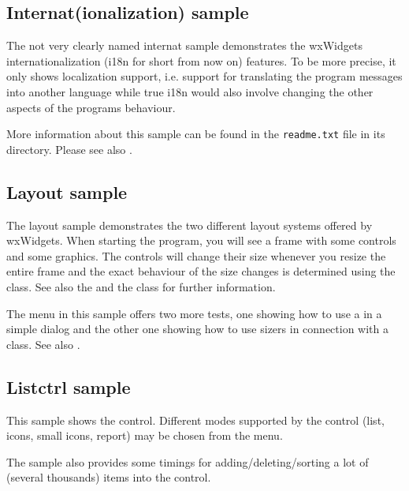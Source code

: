\subsection{Internat(ionalization) sample}\label{sampleinternat}

The not very clearly named internat sample demonstrates the wxWidgets
internationalization (i18n for short from now on) features. To be more
precise, it only shows localization support, i.e. support for translating the
program messages into another language while true i18n would also involve
changing the other aspects of the programs behaviour.

More information about this sample can be found in the {\tt readme.txt} file in
its directory. Please see also .


\subsection{Layout sample}\label{samplelayout}

The layout sample demonstrates the two different layout systems offered
by wxWidgets. When starting the program, you will see a frame with some
controls and some graphics. The controls will change their size whenever
you resize the entire frame and the exact behaviour of the size changes
is determined using the 
class. See also the  and the
class for further information.

The menu in this sample offers two more tests, one showing how to use
a  in a simple dialog and the other one
showing how to use sizers in connection with a 
class. See also .


\subsection{Listctrl sample}\label{samplelistctrl}

This sample shows the  control. Different modes
supported by the control (list, icons, small icons, report) may be chosen from
the menu.

The sample also provides some timings for adding/deleting/sorting a lot of
(several thousands) items into the control.


